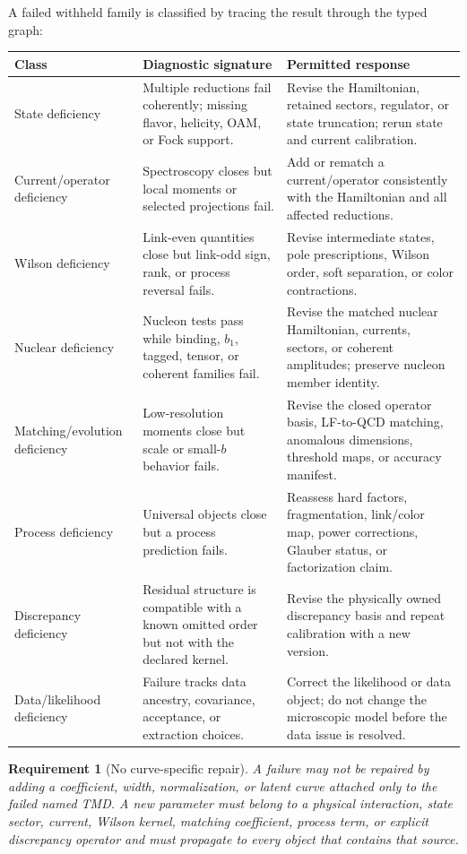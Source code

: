 \documentclass[11pt]{article}
\newtheorem{requirement}[definition]{Requirement}
\begin{document}
A failed withheld family is classified by tracing the result through the
typed graph:
\begin{longtable}{L{0.22\textwidth}L{0.32\textwidth}L{0.37\textwidth}}
\toprule
Class & Diagnostic signature & Permitted response\\
\midrule
\endhead
State deficiency &
Multiple reductions fail coherently; missing flavor, helicity, OAM, or Fock
support. &
Revise the Hamiltonian, retained sectors, regulator, or state truncation; rerun
state and current calibration.\\
Current/operator deficiency &
Spectroscopy closes but local moments or selected projections fail. &
Add or rematch a current/operator consistently with the Hamiltonian and all
affected reductions.\\
Wilson deficiency &
Link-even quantities close but link-odd sign, rank, or process reversal fails. &
Revise intermediate states, pole prescriptions, Wilson order, soft separation,
or color contractions.\\
Nuclear deficiency &
Nucleon tests pass while binding, \(b_1\), tagged, tensor, or coherent families
fail. &
Revise the matched nuclear Hamiltonian, currents, sectors, or coherent
amplitudes; preserve nucleon member identity.\\
Matching/evolution deficiency &
Low-resolution moments close but scale or small-\(b\) behavior fails. &
Revise the closed operator basis, LF-to-QCD matching, anomalous dimensions,
threshold maps, or accuracy manifest.\\
Process deficiency &
Universal objects close but a process prediction fails. &
Reassess hard factors, fragmentation, link/color map, power corrections,
Glauber status, or factorization claim.\\
Discrepancy deficiency &
Residual structure is compatible with a known omitted order but not with the
declared kernel. &
Revise the physically owned discrepancy basis and repeat calibration with a
new version.\\
Data/likelihood deficiency &
Failure tracks data ancestry, covariance, acceptance, or extraction choices. &
Correct the likelihood or data object; do not change the microscopic model
before the data issue is resolved.\\
\bottomrule
\end{longtable}

\begin{requirement}[No curve-specific repair]
A failure may not be repaired by adding a coefficient, width, normalization,
or latent curve attached only to the failed named TMD.  A new parameter must
belong to a physical interaction, state sector, current, Wilson kernel,
matching coefficient, process term, or explicit discrepancy operator and must
propagate to every object that contains that source.
\end{requirement}
\end{document}
